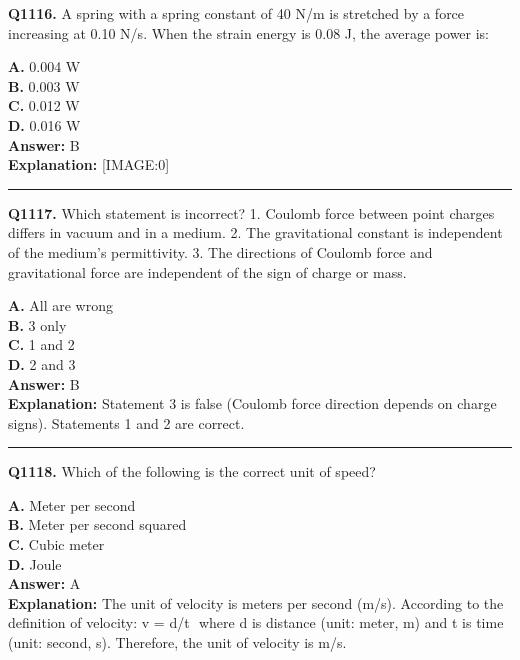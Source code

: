 \documentclass[12pt]{article}
\begin{document}
\noindent
\textbf{Q1116.} A spring with a spring constant of 40 N/m is stretched by a force increasing at 0.10 N/s. When the strain energy is 0.08 J, the average power is:



\textbf{A.} 0.004 W \\
\textbf{B.} 0.003 W \\
\textbf{C.} 0.012 W \\
\textbf{D.} 0.016 W \\

\textbf{Answer:} B \\
\textbf{Explanation:} [IMAGE:0]

\hrule
\vspace{1em}


\noindent
\textbf{Q1117.} Which statement is incorrect?
1.
Coulomb force between point charges differs in vacuum and in a medium.
2.
The gravitational constant is independent of the medium’s permittivity.
3.
The directions of Coulomb force and gravitational force are independent of the sign of charge or mass.



\textbf{A.} All are wrong \\
\textbf{B.} 3 only \\
\textbf{C.} 1 and 2 \\
\textbf{D.} 2 and 3 \\

\textbf{Answer:} B \\
\textbf{Explanation:} Statement 3 is false (Coulomb force direction depends on charge signs). Statements 1 and 2 are correct.

\hrule
\vspace{1em}


\noindent
\textbf{Q1118.} Which of the following is the correct unit of speed?



\textbf{A.} Meter per second \\
\textbf{B.} Meter per second squared \\
\textbf{C.} Cubic meter \\
\textbf{D.} Joule \\

\textbf{Answer:} A \\
\textbf{Explanation:} The unit of velocity is meters per second (m/s). According to the definition of velocity:
v
=
d/t
​
where
d
is distance (unit: meter, m) and
t
is time (unit: second, s). Therefore, the unit of velocity is m/s.
\end{document}

